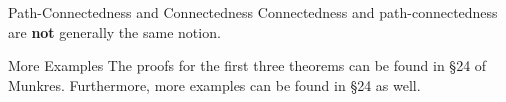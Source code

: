 \begin{remarkBox}{Path-Connectedness and Connectedness}
    Connectedness and path-connectedness are \textbf{not} generally the 
    same notion.
\end{remarkBox}

\begin{remarkBox}{More Examples}
    The proofs for the first three theorems can be found in \S 24 of Munkres.
    Furthermore, more examples can be found in \S 24 as well.
\end{remarkBox}